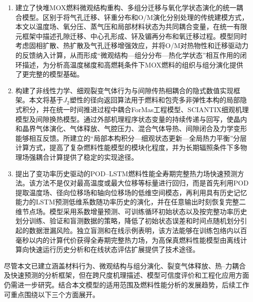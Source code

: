 \begin{enumerate}[label={（\arabic*）},leftmargin=2.8em]
	\item 建立了快堆MOX燃料微观结构重构、多组分迁移与氧化学状态演化的统一耦合模型。区别于将气孔迁移、钚重分布和O/M演化分别处理的传统建模方式，本文以温度场、氧分压、蒸气压和局部材料状态为共同耦合变量，在统一有限元框架中描述孔隙迁移、中心孔形成、钚及镅再分布和氧迁移过程。模型同时考虑固相扩散、热扩散及气孔迁移增强效应，并将O/M对热物性和迁移驱动力的反馈纳入计算，从而形成“微观结构—组分分布—热化学状态”相互作用的闭环描述，为分析高温度梯度和高燃耗条件下MOX燃料的组织与组分演化提供了更完整的模型基础。
	
	\item 构建了非线性力学、细观裂变气体行为与间隙传热相耦合的隐式数值实现框架。本文将基于$J_2$塑性的径向返回算法用于燃料和包壳多非弹性本构的局部隐式积分，并在统一时间推进过程中耦合ForMas工程模型、SCIANTIX细观机理模型及间隙换热模型。通过外部机理程序状态变量的持续传递与回写，使晶内和晶界气体演化、气体释放、气腔压力、混合气体导热、间隙闭合及力学变形能够相互反馈。所建立的“局部本构积分—细观状态更新—全局热力平衡”分层计算方式，提高了复杂燃料性能模型的模块化程度，并为长期辐照条件下多物理场强耦合计算提供了稳定的实现途径。
	
	\item 提出了变功率历史驱动的POD--LSTM燃料性能全寿期完整热力场快速预测方法。该方法不是仅对最高温度或最大位移等标量进行回归，而是首先利用POD提取温度场、径向位移场和轴向位移场的低维空间模态，再利用具有历史记忆能力的LSTM预测低维系数随功率历史的演化，并在任意输出时刻恢复完整二维节点场。模型采用系数增量预测、可训练循环初始状态以及按完整功率历史划分训练、验证和盲测数据的策略，降低了初始状态误差和时间点随机划分引起的数据泄漏风险。独立盲测和在线示例表明，该方法能够在训练包络内以百毫秒以内的计算代价获得全寿期完整热力场，为高保真燃料性能模型由离线计算向快速运行历史分析和在线状态评估扩展提供了技术途径。
\end{enumerate}


尽管本文已建立涵盖材料行为、微观结构与组分演化、裂变气体释放、热--力耦合及快速预测的分析框架，但在跨尺度机理描述、模型可信度评价和工程化应用方面仍需进一步研究。结合本文模型的适用范围及燃料性能分析的发展趋势，后续工作可重点围绕以下三个方面展开。

